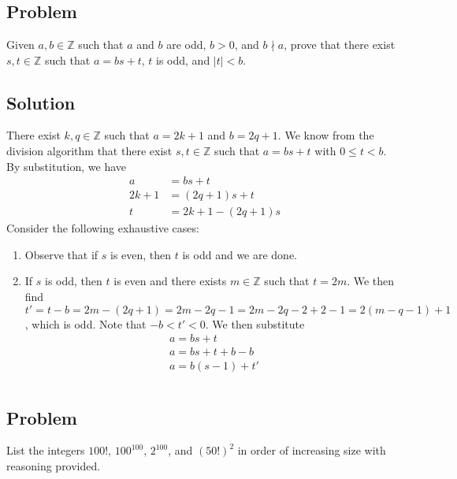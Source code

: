 \documentclass[12pt]{article}
\newcommand{\abs}  [1]{\left|       #1 \right|      }
\newcommand{\Z}    [0]{\mathbb{Z}                   }
\begin{document}
\section{}

\subsection{Problem}
Given $a, b \in \Z$ such that $a$ and $b$ are odd, $b > 0$, and $b \nmid a$, prove that there exist $s, t \in \Z$ such that $a = bs + t$, $t$ is odd, and $\abs{t} < b$.

\subsection{Solution}
There exist $k, q \in \Z$ such that $a = 2k + 1$ and $b = 2q + 1$. We know from the division algorithm that there exist $s, t \in \Z$ such that $a = bs + t$ with $0 \leq t < b$. By substitution, we have
\begin{align*}
    a &= bs + t \\
    2k + 1 &= (2q + 1)s + t \\
    t &= 2k + 1 - (2q + 1)s
\end{align*}
Consider the following exhaustive cases:
\begin{enumerate}
    \item Observe that if $s$ is even, then $t$ is odd and we are done.
    \item If $s$ is odd, then $t$ is even and there exists $m \in \Z$ such that $t = 2m$. We then find $t' = t - b = 2m - (2q + 1) = 2m - 2q - 1 = 2m - 2q - 2 + 2 - 1 = 2(m - q - 1) + 1$, which is odd. Note that $-b < t' < 0$. We then substitute
    \begin{align*}
        a = bs + t \\
        a = bs + t + b - b \\
        a = b(s - 1) + t'
    \end{align*}
\end{enumerate}


\section{}

\subsection{Problem}
List the integers $100!$, $100^{100}$, $2^{100}$, and $(50!)^2$ in order of increasing size with reasoning provided.
\end{document}
